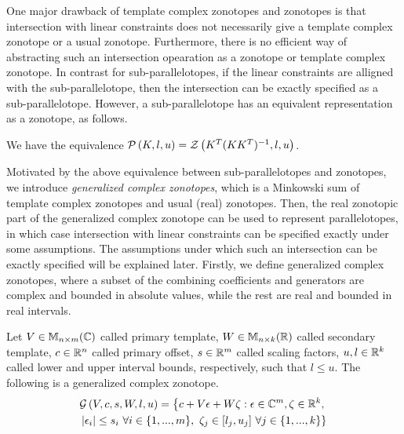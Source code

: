 One major drawback of template complex zonotopes and zonotopes is that
intersection with linear constraints does not necessarily give a
template complex zonotope or a usual zonotope.  Furthermore, there is
no efficient way of abstracting such an intersection opearation as a
zonotope or template complex zonotope.  In contrast for
sub-parallelotopes, if the linear constraints are alligned with the
sub-parallelotope, then the intersection can be exactly specified as a
sub-parallelotope.  However, a sub-parallelotope has
an equivalent representation as a zonotope, as follows.
\begin{proposition}
We have the equivalence $\mathcal{P}\left(K,l,u\right)=\mathcal{Z}\left(K^T(KK^T)^{-1},l,u\right)$.
\end{proposition}

Motivated by the above equivalence between sub-parallelotopes and
zonotopes, we introduce \emph{generalized complex zonotopes}, which is
a Minkowski sum of template complex zonotopes and usual (real)
zonotopes.  Then, the real zonotopic part of the generalized complex
zonotope can be used to represent parallelotopes, in which case
intersection with linear constraints can be specified exactly under
some assumptions.  The assumptions under which such an intersection
can be exactly specified will be explained later.  Firstly, we define
generalized complex zonotopes, where a subset of the combining
coefficients and generators are complex and bounded in absolute
values, while the rest are real and bounded in real intervals.

\begin{definition}
Let $V\in\mathbb{M}_{n\times m}(\mathbb{C})$ called primary template, $W\in\mathbb{M}_{n\times k}(\mathbb{R})$
called secondary template, $c\in\mathbb{R}^n$ called primary offset,
$s\in\mathbb{R}^m$ called scaling factors, $u,l\in\mathbb{R}^k$ called lower
and upper interval bounds, respectively, such that $l\leq u$.  The
following is a generalized complex
zonotope.
\begin{multline}
\mathcal{G}\left(V,c,s,W,l,u\right) =
\left\{
  c+V\epsilon+W\zeta:\epsilon\in\mathbb{C}^m,\zeta\in\mathbb{R}^k,\right.\\ \left.  \left|\epsilon_i\right|\leq
 s_i~\forall i\in\{1,...,m\},~\zeta_j\in[l_j,u_j]~\forall j\in \{1,...,k\}
\right\}
\end{multline}
\end{definition}
